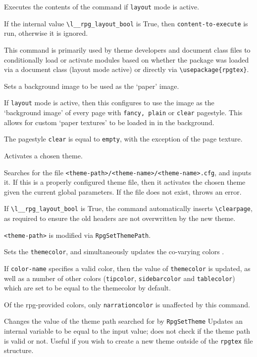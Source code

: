 		\begin{macrolist}
				{
					Executes the contents of the command if \verb|layout| mode is active.
				}
				{
				}
				{
					If the internal value \texttt{\textbackslash{}l\_\_rpg\_layout\_bool} is True, then \verb|content-to-execute| is run, otherwise it is ignored.

					This command is primarily used by theme developers and document class files to conditionally load or activate modules based on whether the package was loaded via a document class (layout mode active) or directly via \verb|\usepackage{rpgtex}|.
				}
			\RpgMacro[RpgSetPaper]{\RpgSetPaper}
				{Sets a background image to be used as the `paper' image.}
				{
				}
				{
					If \verb|layout| mode is active, then this configures \rpgtex{} to use the image as the `background image' of every page with \verb|fancy, plain| or \verb|clear| pagestyle. This allows for custom `paper textures' to be loaded in in the background. 

					The pagestyle \verb|clear| is equal to \verb|empty|, with the exception of the page texture.
				}
				{
					Activates a chosen theme.
				}
				{
				}
				{
					Searches for the file \verb|<theme-path>/<theme-name>/<theme-name>.cfg|, and inputs it. If this is a properly configured theme file, then it activates the chosen theme given the current global parameters. If the file does not exist, throws an error.

					If   \texttt{\textbackslash{}l\_\_rpg\_layout\_bool} is True, the command automatically inserts \verb|\clearpage|, as required to ensure the old headers are not overwritten by the new theme.

					\verb|<theme-path>| is modified via \verb|RpgSetThemePath|.
				}

				{
					Sets the \verb|themecolor|, and simultaneously updates the co-varying colors .
				}{
				}{
					If \verb|color-name| specifies a valid color, then the value of \verb|themecolor| is updated, as well as a number of other colors (\verb|tipcolor|, \verb|sidebarcolor| and \verb|tablecolor|) which are set to be equal to the themecolor by default.

					Of the rpg-provided colors, only \verb|narrationcolor| is unaffected by this command.
				}
				{
					Changes the value of the theme path searched for by \verb|RpgSetTheme|
				}
				{
				}
				{
					Updates an internal variable to be equal to the input value; does not check if the theme path is valid or not. Useful if you wish to create a new theme outside of the \verb|rpgtex| file structure.
				}
			
		\end{macrolist}
